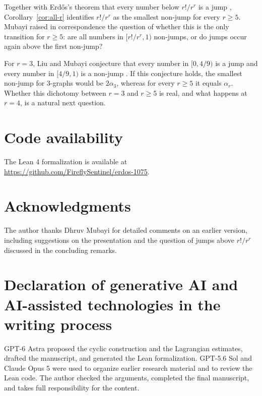 \documentclass[11pt]{article}
\numberwithin{equation}{section}
\begin{document}
Together with Erd\H{o}s's theorem that every number below \(r!/r^r\)
is a jump \cite{Erdos71}, Corollary~\ref{cor:all-r} identifies
\(r!/r^r\) as the smallest non-jump for every \(r\ge5\).
Mubayi raised in correspondence the question of whether this is the
only transition for \(r\ge5\): are all numbers in \([r!/r^r,1)\)
non-jumps, or do jumps occur again above the first non-jump?

For \(r=3\), Liu and Mubayi conjecture that every number in
\([0,4/9)\) is a jump and every number in \([4/9,1)\) is a non-jump
\cite[Conjecture~1.2]{LiuMubayi26}.
If this conjecture holds, the smallest non-jump for \(3\)-graphs
would be \(2\alpha_3\), whereas for every \(r\ge5\)
it equals \(\alpha_r\). Whether this dichotomy between \(r=3\) and
\(r\ge5\) is real, and what happens at \(r=4\), is a natural next question.

\section*{Code availability}

The Lean 4 formalization is available at
\url{https://github.com/FireflySentinel/erdos-1075}.

\section*{Acknowledgments}

The author thanks Dhruv Mubayi for detailed comments on an earlier version,
including suggestions on the presentation and the question of jumps above
\(r!/r^r\) discussed in the concluding remarks.

\section*{Declaration of generative AI and AI-assisted technologies in the writing process}

GPT-6 Astra proposed the cyclic construction and the Lagrangian estimates,
drafted the manu\-script, and generated the Lean formalization.
GPT-5.6 Sol and Claude Opus 5 were used to organize earlier research material
and to review the Lean code.
The author checked the arguments, completed the final manuscript, and takes
full responsibility for the content.
\end{document}
